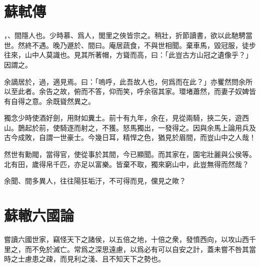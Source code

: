 \theendnotes

\section[方山子傳\quad{\small 蘇軾}]{{\normalsize 蘇軾}\quad {}傳}
，、間隱人也。少時慕、爲人，閭里之俠皆宗之。稍壯，折節讀書，欲以此馳騁當世。然終不遇。晚乃遯於、間曰。庵居蔬食，不與世相聞。棄車馬，毀冠服，徒步往來，山中人莫識也。見其所著帽，方聳而高，曰：「此豈古方山冠之遺像乎？」因謂之。

余謫居於，過，適見焉。曰：「嗚呼，此吾故人也，何爲而在此？」亦矍然問余所以至此者。余告之故，俯而不答，仰而笑，呼余宿其家。環堵蕭然，而妻子奴婢皆有自得之意。余既聳然異之。

獨念少時使酒好劍，用財如糞土。前十{有}九年，余在，見從兩騎，挾二矢，遊西山。鵲起於前，使騎逐而射之，不獲。怒馬獨出，一發得之。因與余馬上論用兵及古今成敗，自謂一{世}豪士。今幾日耳，精悍之色，猶見於眉間，而豈山中之人哉！%

然世有勳閥，當得官，使從事於其間，今已顯聞。而其家在，園宅壯麗與公侯等。北有田，歲得帛千匹，亦足以富樂。皆棄不取，獨來窮山中，此豈無得而然哉？

余聞、間多異人，往往{陽}狂垢汙，不可得而見，儻見之歟？%

\theendnotes

\section[六國論\quad{\small 蘇轍}]{{\normalsize 蘇轍}\quad 六國論}
嘗讀六國世家，竊怪天下之諸侯，以五倍之地，十倍之衆，發憤西向，以攻山西千里之，而不免於滅亡。常爲之深思遠慮，以爲必有可以自安之計，蓋未嘗不咎其當時之士慮患之疎，而見利之淺、且不知天下之勢也。

